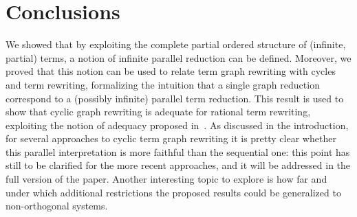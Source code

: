 \documentclass{eptcs}
\theoremstyle{plain}
\theoremstyle{definition}
\begin{document}
\section{Conclusions}
\label{se:conclusion}

We showed that by exploiting the complete partial ordered structure of
(infinite, partial) terms, a notion of infinite parallel reduction can
be defined. Moreover, we proved that this notion can be used to relate
term graph rewriting with cycles and term rewriting, formalizing the
intuition that a single graph reduction correspond to a (possibly
infinite) parallel term reduction. This result is used to
show that cyclic graph rewriting is adequate for rational term
rewriting, exploiting the notion of adequacy proposed in~\cite{KKSV:AGRS}. As discussed in the introduction, for several
approaches to cyclic term graph rewriting it is pretty clear whether
this parallel interpretation is more faithful than the sequential one:
this point has still to be clarified for the more recent approaches, 
and it will be addressed in the full version of the paper. Another
interesting topic to explore is how far and under which additional
restrictions the proposed results could be
generalized to non-orthogonal systems. 





\end{document}
